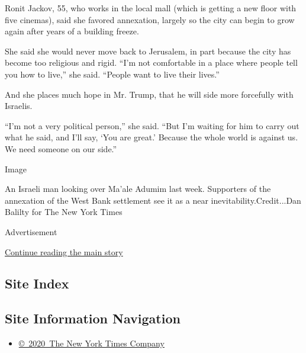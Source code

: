 Ronit Jackov, 55, who works in the local mall (which is getting a new
floor with five cinemas), said she favored annexation, largely so the
city can begin to grow again after years of a building freeze.

She said she would never move back to Jerusalem, in part because the
city has become too religious and rigid. ``I'm not comfortable in a
place where people tell you how to live,'' she said. ``People want to
live their lives.''

And she places much hope in Mr. Trump, that he will side more forcefully
with Israelis.

``I'm not a very political person,'' she said. ``But I'm waiting for him
to carry out what he said, and I'll say, `You are great.' Because the
whole world is against us. We need someone on our side.''

Image

An Israeli man looking over Ma'ale Adumim last week. Supporters of the
annexation of the West Bank settlement see it as a near
inevitability.Credit...Dan Balilty for The New York Times

Advertisement

\protect\hyperlink{after-bottom}{Continue reading the main story}

\hypertarget{site-index}{%
\subsection{Site Index}\label{site-index}}

\hypertarget{site-information-navigation}{%
\subsection{Site Information
Navigation}\label{site-information-navigation}}

\begin{itemize}
\tightlist
\item
  \href{https://help.nytimes.com/hc/en-us/articles/115014792127-Copyright-notice}{©~2020~The
  New York Times Company}
\end{itemize}

